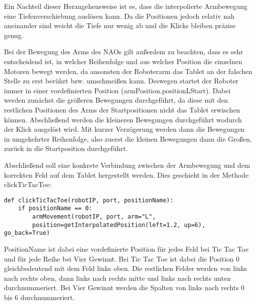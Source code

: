 Ein Nachteil dieser Herangehensweise ist es, dass die interpolierte Armbewegung eine Tiefenverschiebung auslösen kann. Da die Positionen jedoch relativ nah aneinander sind weicht die Tiefe nur wenig ab und die Klicks bleiben präzise genug. 

Bei der Bewegung des Arms des NAOs gilt außerdem zu beachten, dass es sehr entscheidend ist, in welcher Reihenfolge und aus welcher Position die einzelnen Motoren bewegt werden, da ansonsten der Roboterarm das Tablet an der falschen Stelle zu erst berührt bzw. umschmeißen kann. Deswegen startet der Roboter immer in einer vordefinierten Position (armPosition.positionLStart). Dabei werden zunächst die größeren Bewegungen durchgeführt, da diese mit den restlichen Positionen des Arms der Startpositionen nicht das Tablet erwischen können. Abschließend werden die kleineren Bewegungen durchgeführt wodurch der Klick ausgelöst wird. Mit kurzer Verzögerung werden dann die Bewegungen in umgekehrter Reihenfolge, also zuerst die kleinen Bewegungen dann die Großen, zurück in die Startposition durchgeführt. 

Abschließend soll eine konkrete Verbindung zwischen der Armbewegung und dem korrekten Feld auf dem Tablet hergestellt werden. Dies geschieht in der Methode clickTicTacToe:
\begin{verbatim}
def clickTicTacToe(robotIP, port, positionName):
    if positionName == 0:
        armMovement(robotIP, port, arm="L", 
        position=getInterpolatedPosition(left=1.2, up=6), go_back=True)
\end{verbatim}
PositionName ist dabei eine vordefinierte Position für jedes Feld bei Tic Tac Toe und für jede Reihe bei Vier Gewinnt. Bei Tic Tac Toe ist dabei die Position 0 gleichbedeutend mit dem Feld links oben. Die restlichen Felder werden von links nach rechts oben, dann links nach rechts mitte und links nach rechts unten durchnummeriert. Bei Vier Gewinnt werden die Spalten von links nach rechts 0 bis 6 durchnummeriert. 